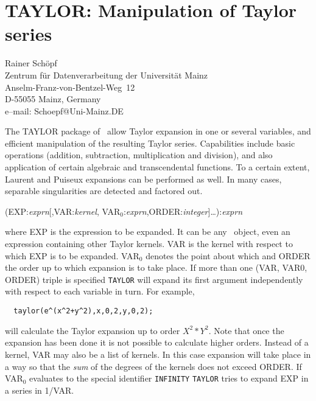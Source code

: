 \chapter{TAYLOR: Manipulation of Taylor series}
\label{TAYLOR}

{\footnotesize
\begin{center}
Rainer Sch\"opf\\
Zentrum f\"ur Datenverarbeitung der Universit\"at Mainz\\
Anselm-Franz-von-Bentzel-Weg~12\\
D-55055 Mainz, Germany  \\[0.05in]
e--mail: Schoepf@Uni-Mainz.DE
\end{center}
}

The TAYLOR package of \REDUCE\ allow Taylor expansion in one or
several variables, and efficient manipulation of the resulting Taylor
series. Capabilities include basic operations (addition, subtraction,
multiplication and division), and also application of certain
algebraic and transcendental functions. To a certain extent, Laurent
and Puiseux expansions can be performed as well.  In many cases,
separable singularities are detected and factored out.

(EXP:{\em exprn}[,VAR:{\em kernel},
            VAR$_0$:{\em exprn},ORDER:{\em integer}]\ldots):{\em exprn}

where EXP is the expression to be expanded.  It can be any \REDUCE\ 
object, even an expression containing other Taylor kernels.  VAR is
the kernel with respect to which EXP is to be expanded.  VAR$_0$
denotes the point about which and ORDER the order up to which
expansion is to take place.  If more than one (VAR, VAR0, ORDER) triple
is specified {\tt TAYLOR} will expand its first argument independently
with respect to each variable in turn.  For example,

\begin{verbatim}
  taylor(e^(x^2+y^2),x,0,2,y,0,2);
\end{verbatim}

will calculate the Taylor expansion up to order $X^{2}*Y^{2}$.
Note that once the expansion has been done it is not possible to 
calculate higher orders.
Instead of a kernel, VAR may also
be a list of kernels. In this case expansion will take place in a way
so that the {\em sum\/} of the degrees of the kernels does not exceed
ORDER.
If VAR$_0$ evaluates to the special identifier \verb|INFINITY|
{\tt TAYLOR} tries to expand EXP in a series in 1/VAR.

